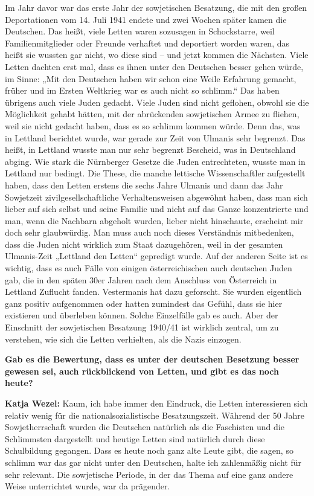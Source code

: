 Im Jahr davor war das erste Jahr der sowjetischen Besatzung, die mit den großen Deportationen vom 14. Juli 1941 endete und zwei Wochen später kamen die Deutschen. Das heißt, viele Letten waren sozusagen in Schockstarre, weil Familienmitglieder oder Freunde verhaftet und deportiert worden waren, das heißt sie wussten gar nicht, wo diese sind – und jetzt kommen die Nächsten. Viele Letten dachten erst mal, dass es ihnen unter den Deutschen besser gehen würde, im Sinne: „Mit den Deutschen haben wir schon eine Weile Erfahrung gemacht, früher und im Ersten Weltkrieg war es auch nicht so schlimm.“ Das haben übrigens auch viele Juden gedacht. Viele Juden sind nicht geflohen, obwohl sie die Möglichkeit gehabt hätten, mit der abrückenden sowjetischen Armee zu fliehen, weil sie nicht gedacht haben, dass es so schlimm kommen würde. Denn das, was in Lettland berichtet wurde, war gerade zur Zeit von Ulmanis sehr begrenzt. Das heißt, in Lettland wusste man nur sehr begrenzt Bescheid, was in Deutschland abging. Wie stark die Nürnberger Gesetze die Juden entrechteten, wusste man in Lettland nur bedingt. Die These, die manche lettische Wissenschaftler aufgestellt haben, dass den Letten erstens die sechs Jahre Ulmanis und dann das Jahr Sowjetzeit zivilgesellschaftliche Verhaltensweisen abgewöhnt haben, dass man sich lieber auf sich selbst und seine Familie und nicht auf das Ganze konzentrierte und man, wenn die Nachbarn abgeholt wurden, lieber nicht hinschaute, erscheint mir doch sehr glaubwürdig. Man muss auch noch dieses Verständnis mitbedenken, dass die Juden nicht wirklich zum Staat dazugehören, weil in der gesamten Ulmanis-Zeit „Lettland den Letten“ gepredigt wurde. Auf der anderen Seite ist es wichtig, dass es auch Fälle von einigen österreichischen auch deutschen Juden gab, die in den späten 30er Jahren nach dem Anschluss von Österreich in Lettland Zuflucht fanden. Vestermanis hat dazu geforscht. Sie wurden eigentlich ganz positiv aufgenommen oder hatten zumindest das Gefühl, dass sie hier existieren und überleben können. Solche Einzelfälle gab es auch. Aber der Einschnitt der sowjetischen Besatzung 1940/41 ist wirklich zentral, um zu verstehen, wie sich die Letten verhielten, als die Nazis einzogen. 

\textbf{Gab es die Bewertung, dass es unter der deutschen Besetzung besser gewesen sei, auch rückblickend von Letten, und gibt es das noch heute?} 

\textbf{Katja Wezel:} Kaum, ich habe immer den Eindruck, die Letten interessieren sich relativ wenig für die nationalsozialistische Besatzungszeit. Während der 50 Jahre Sowjetherrschaft wurden die Deutschen natürlich als die Faschisten und die Schlimmsten dargestellt und heutige Letten sind natürlich durch diese Schulbildung gegangen. Dass es heute noch ganz alte Leute gibt, die sagen, so schlimm war das gar nicht unter den Deutschen, halte ich zahlenmäßig nicht für sehr relevant. Die sowjetische Periode, in der das Thema auf eine ganz andere Weise unterrichtet wurde, war da prägender. 

